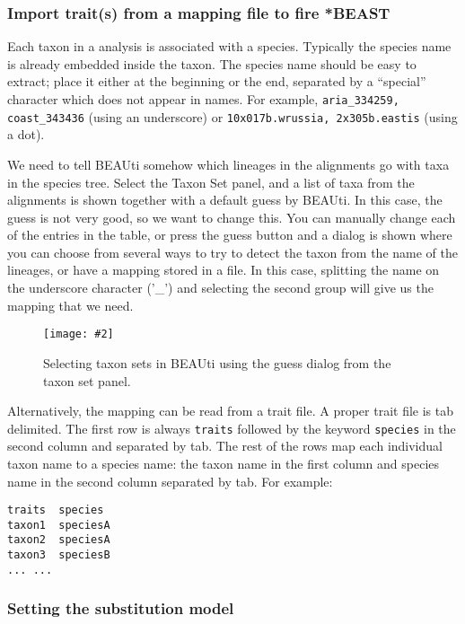 \documentclass{article}
\newcommand{\includeimage}[2][]{%
\texttt{[image: \#2]}
}
\begin{document}
\subsubsection*{Import trait(s) from a mapping file to fire *BEAST}

Each taxon in a \mlstname{} analysis is associated with a species. Typically the
species name is already embedded inside the taxon. The species name should be
easy to extract; place it either at the beginning or the end, separated by a
``special'' character which does not appear in names. For example,
\texttt{aria\_334259, coast\_343436} (using an underscore) or
\texttt{10x017b.wrussia, 2x305b.eastis} (using a dot).

We need to tell BEAUti somehow which lineages in the alignments go with taxa in the species tree. Select the Taxon Set panel, and a list of taxa from the alignments is shown together with a default guess by BEAUti. In this case, the guess is not very good, so we want to change this. You can manually change each of the entries in the table, or press the guess button and a dialog is shown where you can choose from several ways to try to detect the taxon from the name of the lineages, or have a mapping stored in a file. In this case, splitting the name on the underscore character ('\_') and selecting the second group will give us the mapping that we need.

\begin{figure}
\centering
\includeimage[width=\textwidth]{figures/BEAUti_Guess_Taxonsets}

\caption{\label{fig.taxonset} Selecting taxon sets in BEAUti using the guess dialog from the taxon set panel.}
\end{figure}


Alternatively, the mapping can be read from a trait file.
A proper trait file is tab delimited. The first row is always \texttt{traits} followed by the keyword \texttt{species} in the second column and separated by tab. The rest of the rows map each individual taxon name to a species name: the taxon name in the first column and species name in the second column separated by tab. For example:

\begin{verbatim}
traits	species
taxon1	speciesA
taxon2	speciesA
taxon3	speciesB
... ...
\end{verbatim}



\subsubsection*{Setting the substitution model}
\end{document}
